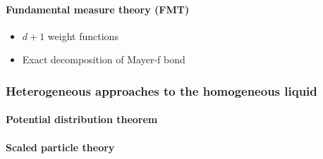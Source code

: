 \paragraph{Fundamental measure theory (FMT)}
\begin{itemize}
\item $d+1$ weight functions
\item Exact decomposition of Mayer-f bond
\end{itemize}

\subsubsection{Heterogeneous approaches to the homogeneous liquid}
\paragraph{Potential distribution theorem}
\paragraph{Scaled particle theory}

